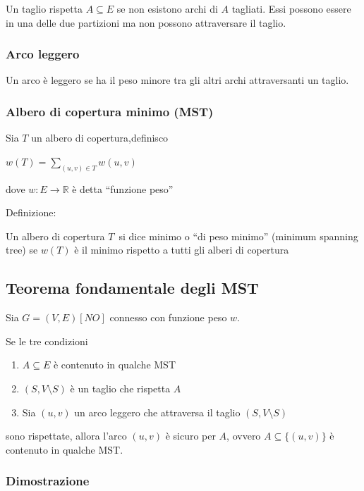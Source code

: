 \documentclass{article}
\providecommand{\tightlist}{%
  \setlength{\itemsep}{0pt}\setlength{\parskip}{0pt}}
\begin{document}
{{{Un taglio rispetta $A \subseteq E$ se non esistono archi di $A$ tagliati. Essi possono essere in una delle due partizioni ma non possono attraversare il taglio.}

\hypertarget{h.gfycwx7ubmbv}{\subsubsection{\texorpdfstring{{Arco
leggero}}{Arco leggero}}\label{h.gfycwx7ubmbv}}

{Un arco è leggero se ha il peso minore tra gli altri archi attraversanti un taglio.}

\hypertarget{h.1evqcdl7exzv}{\subsubsection{\texorpdfstring{{Albero di copertura minimo (MST)}}{Albero di copertura minimo (MST)}}\label{h.1evqcdl7exzv}}

{Sia $T$ un albero di copertura,definisco}

$w(T) = \sum_{(u,v)\in T}{w(u,v)}$

{dove $w:E\rightarrow \mathbb{R}$ è detta ``funzione peso''}

{Definizione:}

{Un albero di copertura }$T${~si dice minimo o ``di peso minimo'' (minimum spanning tree) se $w(T)$ è il minimo rispetto a tutti gli alberi di copertura}

\subsection{Teorema fondamentale degli MST}

{Sia $G=(V,E) [NO]$ connesso con funzione peso $w$.}

{Se le tre condizioni}

\begin{enumerate}
\tightlist
\item
  {$A \subseteq E$ è contenuto in qualche MST}
\item
  {$(S,V \setminus S)$ è un taglio che rispetta $A$}
\item
  {Sia $(u,v)$ un arco leggero che attraversa il taglio $(S,V \setminus S)$}
\end{enumerate}

{sono rispettate, allora l'arco $(u,v)$ è sicuro per $A$, ovvero $A \subseteq \{(u,v)\}$ è contenuto in qualche MST.}

\subsubsection{Dimostrazione}

}}
\end{document}
